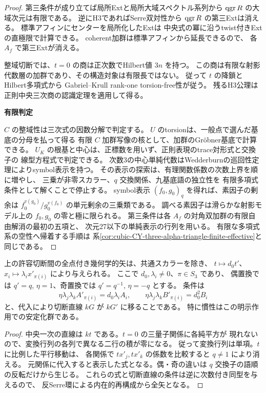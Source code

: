 \begin{proof}
第三条件が成り立てば局所Extと局所大域スペクトル系列から
$\operatorname{qgr} R$ の大域次元は有限である。
逆にH3であればSerre双対性から $\operatorname{qgr} R$ の第三Extは消える。
標準アフィンにセンターを局所化したExtは
中央式の冪に沿うtwist付きExtの直極限で計算できる。
coherent加群は標準アフィンから延長できるので、
各 $A_f$ で第三Extが消える。

整域切断では、$t=0$ の商は正次数でHilbert値 $3n$ を持つ。
この商は有限な射影代数層の加群であり、その構造対象は有限長ではない。
従って $t$ の降鎖とHilbert多項式から
Gabriel--Krull rank-one torsion-free性が従う。
残るH3公理は正則中央三次商の認識定理を適用して得る。

\medskip\noindent\textbf{有限判定}\par
$C$ の整域性は三次式の因数分解で判定する。
$U$ のtorsionは、一般点で選んだ基底の分母を払って得る
有限 $C$ 加群写像の核として、加群のGr\"obner基底で計算できる。
$U_K$ の根基と中心は、正標数を用いず、正則表現のtrace対形式と交換子の
線型方程式で判定できる。
次数3の中心単純代数はWedderburnの巡回性定理によりsymbol表示を持つ。
その表示の探索は、有理関数係数の次数上界を順に増やし、
三乗が非零スカラー、$q$ 交換関係、九基底語の独立性を
有限多項式条件として解くことで停止する。
symbol表示 $(f_0,g_0)_q$ を得れば、素因子の剰余は
$f_0^{v(g_0)}/g_0^{v(f_0)}$ の単元剰余の三乗類である。
調べる素因子は滑らかな射影モデル上の $f_0,g_0$ の零と極に限られる。
第三条件は各 $A_f$ の対角双加群の有限自由解消の最初の五項と、
次元27以下の単純表示の行列を用いる。
有限な多項式系の空性へ帰着する手順は
系\ref{cor:cubic-CY-three-alpha-triangle-finite-effective}と同じである。
\end{proof}

\begin{proposition}\label{prop:cubic-CY-three-alpha-primitive-triangle-arrows}
上の許容切断間の全点付き幾何学的矢は、共通スカラーを除き、
$t\mapsto d_0t'$、$x_i\mapsto\lambda_i x'_{\pi(i)}$ により与えられる。
ここで $d_0,\lambda_i\ne0$、$\pi\in S_3$ であり、
偶置換では $q'=q$, $\eta=1$、奇置換では $q'=q^{-1}$, $\eta=-q$ とする。
条件は
\[
 \eta\lambda_j\lambda_k A'_{\pi(i)}=d_0\lambda_i A_i,\qquad
 \eta\lambda_j\lambda_k B'_{\pi(i)}=d_0^2 B_i
\]
と、代入により切断直線 $kG$ が $kG'$ に移ることである。
特に慣性はこの明示作用での安定化群である。
\end{proposition}
\begin{proof}
中央一次の直線は $kt$ である。$t=0$ の三量子関係に各純平方が
現れないので、変換行列の各列で異なる二行の積が零になる。
従って変換行列は単項。$t$ に比例した平行移動は、
各関係で $t x'_j,t x'_k$ の係数を比較すると $q\ne1$ により消える。
元関係に代入すると表示した式となる。偶・奇の違いは
$q$ 交換子の語順の反転だけから生じる。
これらの式と切断直線の条件は逆に次数付き同型を与えるので、
反Serre環による内在的再構成から全矢となる。
\end{proof}
